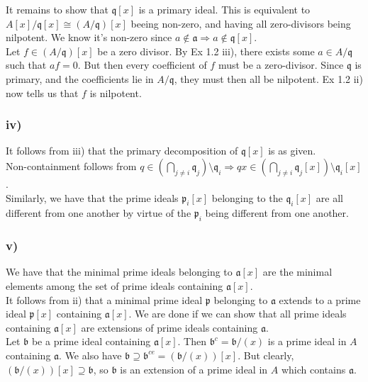 \documentclass{article}
\theoremstyle{definition}
\begin{document}
It remains to show that $\mathfrak{q}[x]$ is a primary ideal. This is
equivalent to $A[x]/\mathfrak{q}[x] \cong (A/\mathfrak{q})[x]$ beeing non-zero,
and having all zero-divisors being nilpotent. We know it's non-zero since $a
\not \in \mathfrak{a} \Rightarrow a \not \in \mathfrak{q}[x]$. \\

Let $f \in (A/\mathfrak{q})[x]$ be a zero divisor. By Ex 1.2 iii), there exists
some $a \in A/\mathfrak{q}$ such that $af = 0$. But then every coefficient of
$f$ must be a zero-divisor. Since $\mathfrak{q}$ is primary, and the
coefficients lie in $A/\mathfrak{q}$, they must then all be nilpotent. Ex 1.2
ii) now tells us that $f$ is nilpotent.

\subsubsection*{iv)}

It follows from iii) that the primary decomposition of $\mathfrak{q}[x]$ is as
given. \\

Non-containment follows from $q \in \left(\bigcap_{j \not = i} \mathfrak{q}_j\right)
\setminus \mathfrak{q}_i \Rightarrow qx \in \left(\bigcap_{j \not = i}
\mathfrak{q}_j[x]\right) \setminus \mathfrak{q}_i[x]$. \\

Similarly, we have that the prime ideals $\mathfrak{p}_i[x]$ belonging to the
$\mathfrak{q}_i[x]$ are all different from one another by virtue of the
$\mathfrak{p}_i$ being different from one another.

\subsubsection*{v)}

We have that the minimal prime ideals belonging to $\mathfrak{a}[x]$ are the
minimal elements among the set of prime ideals containing $\mathfrak{a}[x]$. \\

It follows from ii) that a minimal prime ideal $\mathfrak{p}$ belonging to
$\mathfrak{a}$ extends to a prime ideal $\mathfrak{p}[x]$ containing
$\mathfrak{a}[x]$. We are done if we can show that all prime ideals containing
$\mathfrak{a}[x]$ are extensions of prime ideals containing $\mathfrak{a}$. \\

Let $\mathfrak{b}$ be a prime ideal containing $\mathfrak{a}[x]$. Then
$\mathfrak{b}^{c} = \mathfrak{b}/(x)$ is a prime ideal in $A$ containing
$\mathfrak{a}$. We also have $\mathfrak{b} \supseteq \mathfrak{b}^{ce} =
(\mathfrak{b}/(x))[x]$. But clearly, $(\mathfrak{b}/(x))[x] \supseteq
\mathfrak{b}$, so $\mathfrak{b}$ is an extension of a prime ideal in $A$ which
contains $\mathfrak{a}$.
\end{document}
